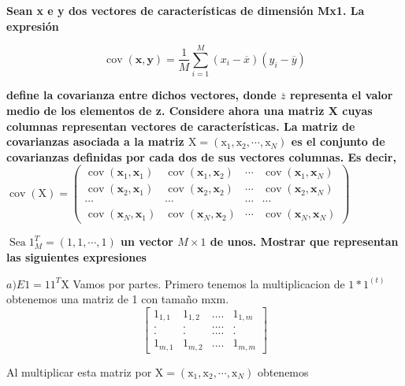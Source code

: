 \documentclass[titlepage]{article}
\begin{document}
  	\textbf{Sean x e y dos vectores de características de dimensión Mx1. La expresión}
  	
  	$$\operatorname{cov}(\mathbf{x}, \mathbf{y})=\frac{1}{M} \sum_{i=1}^{M}\left(x_{i}-\overline{x}\right)\left(y_{i}-\overline{y}\right)$$
  	
  	\textbf{define la covarianza entre dichos vectores, donde $\overline{z}$ representa el valor medio de los elementos de z. Considere ahora una matriz X cuyas columnas representan vectores de características. La matriz de covarianzas asociada a la matriz $\mathrm{X}=\left(\mathrm{x}_{1}, \mathrm{x}_{2}, \cdots, \mathrm{x}_{N}\right)$ es el conjunto de covarianzas definidas por cada dos de sus vectores columnas. Es decir,}
  	$\operatorname{cov}(\mathrm{X})=\left( \begin{array}{cccc}{\operatorname{cov}\left(\mathbf{x}_{1}, \mathbf{x}_{1}\right)} & {\operatorname{cov}\left(\mathbf{x}_{1}, \mathbf{x}_{2}\right)} & {\cdots} & {\operatorname{cov}\left(\mathbf{x}_{1}, \mathbf{x}_{N}\right)} \\ {\operatorname{cov}\left(\mathbf{x}_{2}, \mathbf{x}_{1}\right)} & {\operatorname{cov}\left(\mathbf{x}_{2}, \mathbf{x}_{2}\right)} & {\cdots} & {\operatorname{cov}\left(\mathbf{x}_{2}, \mathbf{x}_{N}\right)} \\ {\cdots} & {\cdots} & {\cdots} & {\cdots} \\ {\operatorname{cov}\left(\mathbf{x}_{N}, \mathbf{x}_{1}\right)} & {\operatorname{cov}\left(\mathbf{x}_{N}, \mathbf{x}_{2}\right)} & {\cdots} & {\operatorname{cov}\left(\mathbf{x}_{N}, \mathbf{x}_{N}\right)}\end{array}\right)$
  	
  	\textbf{$\operatorname{Sea} 1_{M}^{T}=(1,1, \cdots, 1)$ un vector $M \times 1$ de unos. Mostrar que representan las siguientes expresiones}
  	\newline
  	
  	$a ) E 1=11^{T} \mathrm{X}$
  	\newline
  	Vamos por partes. Primero tenemos la multiplicacion de $1*1^{(t)}$ obtenemos una matriz de 1 con tamaño mxm.
  	\[
  	\begin{bmatrix}
  	1_{1,1} & 1_{1,2} & .... & 1_{1,m} \\
  	. & . & .... & .\\	
  	. & . & .... & .\\	
  	1_{m,1} & 1_{m,2} & .... & 1_{m,m}
  	\end{bmatrix}
  	\]
  	
  	Al multiplicar esta matriz por $\mathrm{X}=\left(\mathrm{x}_{1}, \mathrm{x}_{2}, \cdots, \mathrm{x}_{N}\right)$ obtenemos
  	
\end{document}

